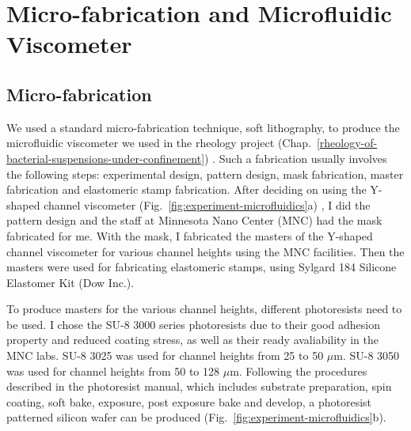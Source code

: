 \section{Micro-fabrication and Microfluidic Viscometer}
\label{micro-fabrication-and-microfluidics}

\subsection{Micro-fabrication}

We used a standard micro-fabrication technique, soft lithography, to produce the microfluidic viscometer we used in the rheology project (Chap.~\ref{rheology-of-bacterial-suspensions-under-confinement}) \cite{Qin2010}. Such a fabrication usually involves the following steps: experimental design, pattern design, mask fabrication, master fabrication and elastomeric stamp fabrication.
After deciding on using the Y-shaped channel viscometer (Fig.~\ref{fig:experiment-microfluidics}a) \cite{Gachelin2013}, I did the pattern design and the staff at Minnesota Nano Center (MNC) had the mask fabricated for me. With the mask, I fabricated the masters of the Y-shaped channel viscometer for various channel heights using the MNC facilities. Then the masters were used for fabricating elastomeric stamps, using Sylgard 184 Silicone Elastomer Kit (Dow Inc.).

To produce masters for the various channel heights, different photoresists need to be used. I chose the SU-8 3000 series photoresists due to their good adhesion property and reduced coating stress, as well as their ready avaliability in the MNC labs. SU-8 3025 was used for channel heights from 25 to 50 $\mu$m. SU-8 3050 was used for channel heights from 50 to 128 $\mu$m. Following the procedures described in the photoresist manual, which includes substrate preparation, spin coating, soft bake, exposure, post exposure bake and develop, a photoresist patterned silicon wafer can be produced (Fig.~\ref{fig:experiment-microfluidics}b).

